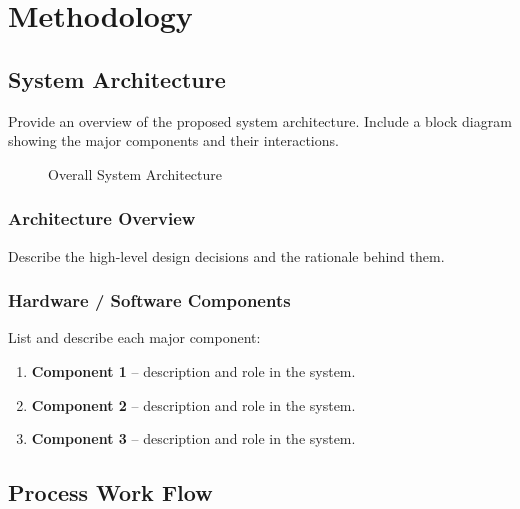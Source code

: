 \chapter{Methodology}
\label{chap:methodology}

\section{System Architecture}
\label{sec:architecture}

Provide an overview of the proposed system architecture. Include a
block diagram showing the major components and their interactions.

\begin{figure}[htbp]
  \centering
  \caption{Overall System Architecture}
  \label{fig:architecture}
\end{figure}

\subsection{Architecture Overview}
\label{subsec:arch_overview}

Describe the high-level design decisions and the rationale behind them.

\subsection{Hardware / Software Components}
\label{subsec:components}

List and describe each major component:

\begin{enumerate}
  \item \textbf{Component 1} -- description and role in the system.
  \item \textbf{Component 2} -- description and role in the system.
  \item \textbf{Component 3} -- description and role in the system.
\end{enumerate}

\section{Process Work Flow}
\label{sec:workflow}

